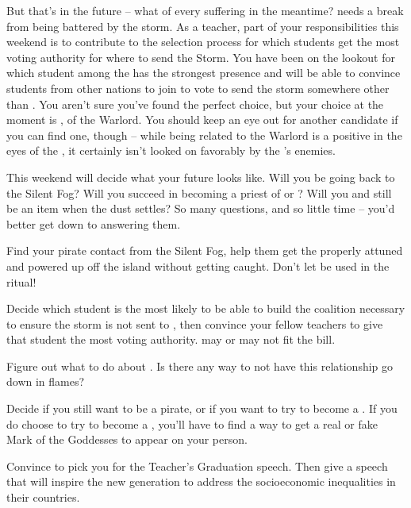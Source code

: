 \documentclass[char]{GL2020}
\begin{document}
{But that’s in the future -- what of every suffering in the meantime? \pShip{} needs a break from being battered by the storm. As a teacher, part of your responsibilities this weekend is to contribute to the selection process for which students get the most voting authority for where to send the Storm. You have been on the lookout for which student among the \pShippies{} has the strongest presence and will be able to convince students from other nations to join to vote to send the storm somewhere other than \pShip{}. You aren’t sure you’ve found the perfect choice, but your choice at the moment is \cWarlordDaughter{}, \cWarlordDaughter{\child} of the \pShip{} Warlord. You should keep an eye out for another candidate if you can find one, though -- while being related to the Warlord is a positive in the eyes of the \pShip{}, it certainly isn’t looked on favorably by the \pShip{}’s enemies.

This weekend will decide what your future looks like. Will you be going back to the Silent Fog? Will you succeed in becoming a priest of \cEbb{} or \cFlow{}? Will you and \cPrince{} still be an item when the dust settles? So many questions, and so little time  -- you’d better get down to answering them.

\begin{itemz}[Goals]
	\item Find your pirate contact from the Silent Fog, help them get the properly attuned and powered up \iNet{} off the island without getting caught. Don’t let \iNet{} be used in the ritual!
	\item Decide which \pShip{} student is the most likely to be able to build the coalition necessary to ensure the storm is not sent to \pShip{}, then convince your fellow teachers to give that student the most voting authority. \cWarlordDaughter{} may or may not fit the bill.
	\item Figure out what to do about \cPrince{}. Is there any way to not have this relationship go down in flames?
	\item Decide if you still want to be a pirate, or if you want to try to become a \cPirate{\cleric}. If you do choose to try to become a \cPirate{\cleric}, you’ll have to find a way to get a real or fake Mark of the Goddesses to appear on your person.
	\item Convince \cMusic{} to pick you for the Teacher’s Graduation speech. Then give a speech that will inspire the new generation to address the socioeconomic inequalities in their countries.
\end{itemz}

}
\end{document}
